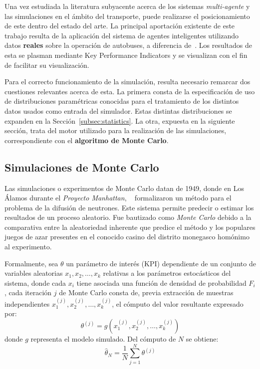 Una vez estudiada la literatura subyacente acerca de los sistemas \textit{multi-agente} y las simulaciones en el ámbito
del transporte, puede realizarse el posicionamiento de este dentro del estado del arte.
La principal aportación existente de este trabajo resulta de la aplicación del sistema de agentes inteligentes utilizando
datos \textbf{reales} sobre la operación de autobuses, a diferencia de~\textcite{Fanfani2025FastAgent}. Los resultados de
esta se plasman mediante Key Performance Indicators y se visualizan con el fin de facilitar su visualización.

Para el correcto funcionamiento de la simulación, resulta necesario remarcar dos cuestiones relevantes acerca de esta.
La primera consta de la especificación de uso de distribuciones paramétricas conocidas para el tratamiento de los distintos
datos usados como entrada del simulador. Estas distintas distribuciones se expanden en la Sección~\ref{subsec:statistics}.
La otra, expuesta en la siguiente sección, trata del motor utilizado para la realización de las simulaciones, correspondiente
con el \textbf{algoritmo de Monte Carlo}.


\subsection{Simulaciones de Monte Carlo}\label{subsec:montecarlo}
Las simulaciones o experimentos de Monte Carlo datan de 1949, donde en Los Álamos durante el \textit{Proyecto Manhattan},
~\textcite{metropolis1949montecarlo} formalizaron un método para el problema de la difusión de neutrones. Este sistema 
permite predecir o estimar los resultados de un proceso aleatorio. Fue bautizado
como \textit{Monte Carlo} debido a la comparativa entre la aleatoriedad inherente que predice el método y los populares
juegos de azar presentes en el conocido casino del distrito monegasco homónimo al experimento.

Formalmente, sea $\theta$ un parámetro de interés (KPI) dependiente de un conjunto de variables aleatorias $x_1, x_2,
\ldots, x_k$ relativas a los parámetros estocásticos del sistema, donde cada $x_i$ tiene asociada una función de densidad
de probabilidad $F_i$, cada iteración $j$ de Monte Carlo consta de, previa extracción de muestras independientes $x_1^{(j)}, 
x_2^{(j)}, \ldots, x_k^{(j)}$, el cómputo del valor resultante expresado por:
\begin{equation}
\theta^{(j)} = g(x_1^{(j)}, x_2^{(j)}, \ldots, x_k^{(j)})
\end{equation}
donde $g$ representa el modelo simulado. Del cómputo de $N$ se obtiene:
\begin{equation}
    \hat{\theta}_N = \frac{1}{N}\sum_{j=1}^{N}{\theta^{(j)}}
\end{equation}

